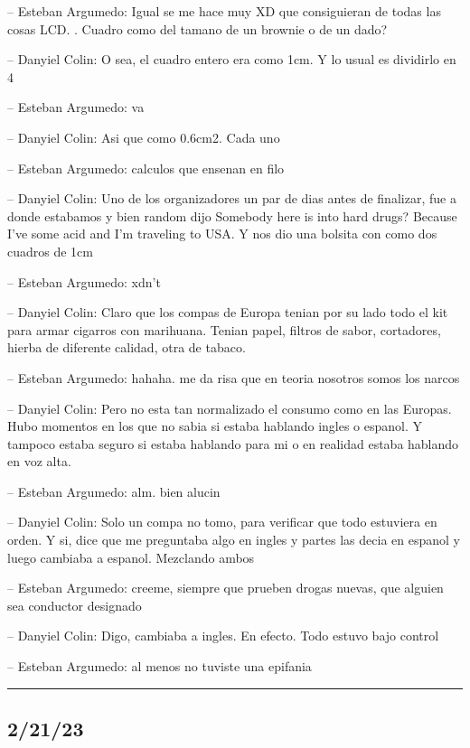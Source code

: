 -- Esteban Argumedo: Igual se me hace muy XD que consiguieran de todas
las cosas LCD. . Cuadro como del tamano de un brownie o de un dado?

-- Danyiel Colin: O sea, el cuadro entero era como 1cm. Y lo usual es
dividirlo en 4

-- Esteban Argumedo: va

-- Danyiel Colin: Asi que como 0.6cm2. Cada uno

-- Esteban Argumedo: calculos que ensenan en filo

-- Danyiel Colin: Uno de los organizadores un par de dias antes de
finalizar, fue a donde estabamos y bien random dijo Somebody here is
into hard drugs? Because I've some acid and I'm traveling to USA. Y nos
dio una bolsita con como dos cuadros de 1cm

-- Esteban Argumedo: xdn't

-- Danyiel Colin: Claro que los compas de Europa tenian por su lado todo
el kit para armar cigarros con marihuana. Tenian papel, filtros de
sabor, cortadores, hierba de diferente calidad, otra de tabaco.

-- Esteban Argumedo: hahaha. me da risa que en teoria nosotros somos los
narcos

-- Danyiel Colin: Pero no esta tan normalizado el consumo como en las
Europas. Hubo momentos en los que no sabia si estaba hablando ingles o
espanol. Y tampoco estaba seguro si estaba hablando para mi o en
realidad estaba hablando en voz alta.

-- Esteban Argumedo: alm. bien alucin

-- Danyiel Colin: Solo un compa no tomo, para verificar que todo
estuviera en orden. Y si, dice que me preguntaba algo en ingles y partes
las decia en espanol y luego cambiaba a espanol. Mezclando ambos

-- Esteban Argumedo: creeme, siempre que prueben drogas nuevas, que
alguien sea conductor designado

-- Danyiel Colin: Digo, cambiaba a ingles. En efecto. Todo estuvo bajo
control

-- Esteban Argumedo: al menos no tuviste una epifania

\begin{center}\rule{0.5\linewidth}{0.5pt}\end{center}

\hypertarget{section-185}{%
\subsection{2/21/23}\label{section-185}}

